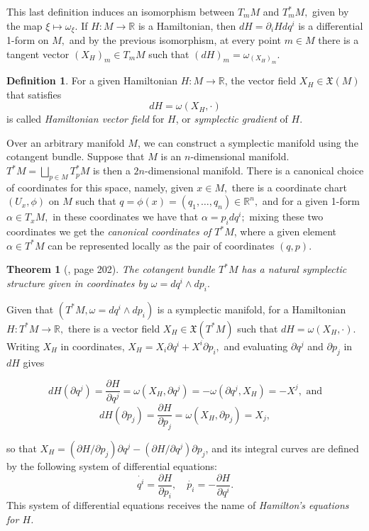 \documentclass[12pt, letterpaper, reqno]{amsart}
\theoremstyle{definition}
\newtheorem{df}{Definition}
\theoremstyle{plain}
\newtheorem{thm}{Theorem}
\theoremstyle{remark}
\begin{document}
This last definition induces an isomorphism between $ T_mM $ and $ T^*_mM, $ given by the map $ \xi \mapsto \omega_\xi. $ If $ H: M \rightarrow \mathbb{R} $ is a Hamiltonian, then $ dH = \partial_i H dq^i $ is a differential 1-form on $ M, $ and by the previous isomorphism, at every point $ m\in M $ there is a tangent vector $ (X_H)_m \in T_mM $ such that $ (dH)_m = \omega_{(X_H)_m}. $ 

\begin{df}
	For a given Hamiltonian $ H: M \rightarrow \mathbb{R} $, the vector field $ X_H\in \mathfrak{X}(M) $ that satisfies $$ dH = \omega(X_H, \cdot) $$ is called \textit{Hamiltonian vector field} for $ H $, or \textit{symplectic gradient} of $ H. $ 
\end{df}

Over an arbitrary manifold $ M $, we can construct a symplectic manifold using the cotangent bundle. Suppose that $ M $ is an $ n$-dimensional manifold. $ T^*M= \bigsqcup_{p\in M} T^*_p M$ is then a $ 2n $-dimensional manifold. There is a canonical choice of coordinates for this space, namely, given $ x\in M, $ there is a coordinate chart $ (U_x,\phi) $ on $ M $ such that $ q=\phi(x)=(q_1,\dots,q_n)\in \mathbb{R}^n, $ and for a given 1-form $ \alpha\in T_xM,$ in these coordinates we have that $ \alpha=p_i dq^i; $ mixing these two coordinates we get the \textit{canonical coordinates of $ T^*M $}, where a given element $ \alpha\in T^*M $ can be represented locally as the pair of coordinates $ (q,p). $      

\begin{thm}[\cite{arnol2013mathematical}, page 202]
	The cotangent bundle $ T^*M $ has a natural symplectic structure given in coordinates by $\omega = dq^i\wedge dp_i.$
\end{thm}

Given that $ (T^*M, \omega = dq^i\wedge dp_i) $ is a symplectic manifold, for a Hamiltonian $ H: T^*M \rightarrow \mathbb{R}, $ there is a vector field $ X_H \in \mathfrak{X}(T^*M) $ such that $ dH = \omega (X_H,\cdot) $. Writing $ X_H $ in coordinates, $ X_H = X_i \partial q^i + X^i \partial p_i, $ and evaluating $ \partial q^j $ and $ \partial p_j $ in $ dH $ gives  

$$ dH(\partial q^j) = \frac{\partial H}{\partial q^j} = \omega(X_H, \partial q^j) = -\omega(\partial q^j, X_H) = -X^j, \text{ and}  $$ 
$$ dH(\partial p_j) = \frac{\partial H}{\partial p_j} =\omega(X_H, \partial p_j)=X_j, $$ 

so that $ X_H = (\partial H/\partial p_j)\partial q^j - (\partial H / \partial q^j)\partial p_j $, and its integral curves are defined by the following system of differential equations:
$$ \dot{q^i} = \frac{\partial H}{\partial p_i}, \quad \dot{p_i} =- \frac{\partial H}{\partial q^i}.   $$ 
This system of differential equations receives the name of \textit{Hamilton's equations for $ H $.} 
\end{document}
